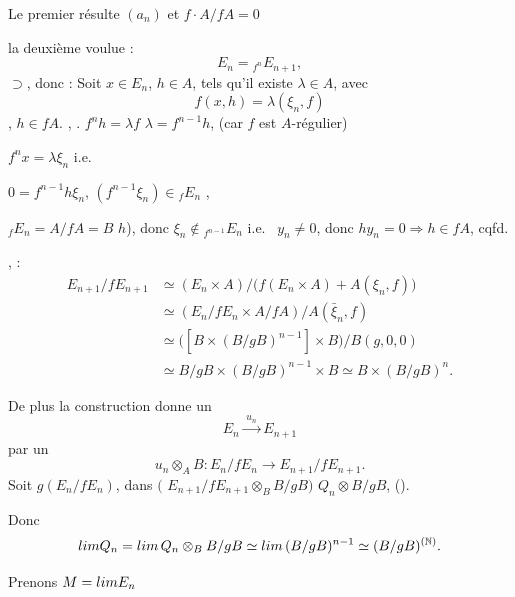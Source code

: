 \documentclass[11pt,a4paper]{article}
\begin{document}
Le premier résulte \ill{} $(a_n)$ et $f \cdot A/fA = 0$

la deuxième \struck{\ill{}} \ill{} voulue :
\[
E_n = {}_{f^n}E_{n+1},
\]
\ill{} $\supset$, donc : \ill{} Soit $x \in E_n$, $h \in A$, \struck{\ill{}}
tels qu'il existe $\lambda \in A$, avec
\[
f(x,h) = \lambda(\xi_n, f)
\]
\ill{}, \ill{} $h \in fA$. \ill{}, \ill{}.
$f^n h = \lambda f$ \ill{} $\lambda = f^{n-1}h$, (car $f$ est $A$-régulier)


$f^n x = \lambda \xi_n$ \struck{\ill{}} \ill{} i.e.


$0 = f^{n-1} h \xi_n$, \ill{} $(f^{n-1}\xi_n) \in {}_fE_n$ \ill{},

 \ill{} ${}_fE_n = A/fA = B$ \ill{} $h$), donc \ill{}
\ill{} \ill{} $\xi_n \notin {}_{f^{n-1}}E_n$ i.e.\ 
$y_n \neq 0$, donc $h y_n = 0 \Longrightarrow h \in fA$, cqfd.

,  \ill{} :
\begin{align*}
E_{n+1}/fE_{n+1} &\simeq (E_n \times A) \big/ \big( f(E_n \times A) + A(\xi_n, f) \big) \\
&\simeq (E_n/fE_n \times A/fA) \big/ A(\bar{\xi}_n, f) \\
&\simeq \big( [B \times (B/gB)^{n-1}] \times B \big) \big/ B(g, 0, 0) \\
&\simeq B/gB \times (B/gB)^{n-1} \times B \simeq B \times (B/gB)^{n}.
\end{align*}

De plus la construction \ill{} donne un 
\[
E_n \xrightarrow{\;u_n\;} E_{n+1}
\]
 par \ill{} un \ill{}
\[
u_n \otimes_A B : E_n/fE_n \longrightarrow E_{n+1}/fE_{n+1}.
\]
Soit \emph{\ill{}} \ill{} $g(E_n/fE_n)$,  \ill{} \ill{}
 dans $($\struck{\ill{}} $E_{n+1}/fE_{n+1} \otimes_B
B/gB)$ \ill{} \struck{\ill{}} \ill{} $Q_n \otimes B/gB$, \ill{} \ill{}
(\ill{}).

Donc
\[
\varinjlim Q_n = \varinjlim\, Q_n \otimes_B B/gB \simeq \varinjlim\, (B/gB)^{n-1}
\simeq (B/gB)^{(\mathbb{N})}.
\]

Prenons $M = \varinjlim E_n$
\end{document}
